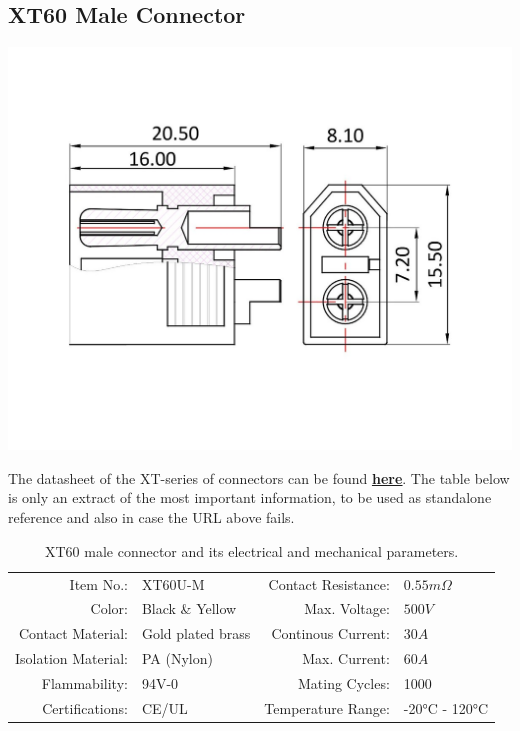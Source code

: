 \clearpage %

\subsection{XT60 Male Connector}

\includegraphics[width=\textwidth]{contents/figures/xt60_m.jpg}

The datasheet of the XT-series of connectors can be found \href{https://www.lcsc.com/datasheet/lcsc_datasheet_1810251312_Changzhou-Amass-Elec-XT60U-M_C129184.pdf}{\textbf{\underline{here}}}.
The table below is only an extract of the most important information, to be used as standalone reference and also in case the URL above fails.

\begin{table}[h] %
    \begin{tabular}{rlrl}
         Item No.:&  XT60U-M &  Contact Resistance:& $0.55m \Omega$\\
         Color:&  Black \& Yellow&  Max. Voltage:& $500V$\\
         Contact Material:&  Gold plated brass&  Continous Current:& $30A$\\
         Isolation Material:&  PA (Nylon)&  Max. Current:& $60A$\\
         Flammability:&  94V-0&  Mating Cycles:& 1000\\
         Certifications:&  CE/UL&  Temperature Range:& -20°C - 120°C\\
    \end{tabular}
    \caption{XT60 male connector and its electrical and mechanical parameters.}
    \label{xt60_f_specs}
\end{table}

